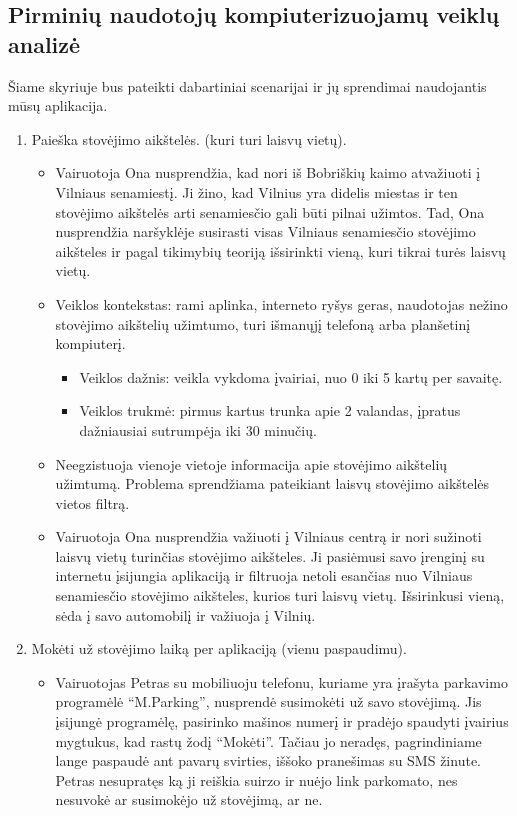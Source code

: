 \documentclass{VUMIFPSkursinis}
\begin{document}
\subsection{Pirminių naudotojų kompiuterizuojamų veiklų analizė}
Šiame skyriuje bus pateikti dabartiniai scenarijai ir jų sprendimai naudojantis mūsų aplikacija.
\begin{enumerate}[label = \textbf{PV\arabic*.}]
	\item Paieška stovėjimo aikštelės. (kuri turi laisvų vietų).
		\begin{itemize}[label={-}]
			\item Vairuotoja Ona nusprendžia, kad nori iš Bobriškių kaimo atvažiuoti į Vilniaus senamiestį. Ji žino, kad Vilnius yra didelis miestas ir ten stovėjimo aikštelės  arti senamiesčio gali būti pilnai užimtos. Tad, Ona nusprendžia naršyklėje susirasti visas Vilniaus senamiesčio stovėjimo aikšteles ir pagal tikimybių teoriją išsirinkti vieną, kuri tikrai turės laisvų vietų.

			\item Veiklos kontekstas: rami aplinka, interneto ryšys geras, naudotojas nežino stovėjimo aikštelių užimtumo, turi išmanųjį telefoną arba planšetinį kompiuterį.
				\begin{itemize}[label={$\bullet$}]
					\item Veiklos dažnis: veikla vykdoma įvairiai, nuo 0 iki 5 kartų per savaitę.
					\item Veiklos trukmė: pirmus kartus trunka apie 2 valandas, įpratus dažniausiai sutrumpėja iki 30 minučių.
				\end{itemize}
			\item Neegzistuoja vienoje vietoje informacija apie stovėjimo aikštelių užimtumą. Problema sprendžiama pateikiant laisvų stovėjimo aikštelės vietos filtrą.

			\item Vairuotoja Ona nusprendžia važiuoti į Vilniaus centrą ir nori sužinoti laisvų vietų turinčias stovėjimo aikšteles. Ji pasiėmusi savo įrenginį su internetu įsijungia aplikaciją ir filtruoja netoli esančias nuo Vilniaus senamiesčio stovėjimo aikšteles, kurios turi laisvų vietų. Išsirinkusi vieną, sėda į savo automobilį ir važiuoja į Vilnių.
		\end{itemize}	
	
		
	\item Mokėti už stovėjimo laiką per aplikaciją (vienu paspaudimu).
		\begin{itemize}[label={-}]
			\item Vairuotojas Petras su mobiliuoju telefonu, kuriame yra įrašyta parkavimo programėlė “M.Parking”, nusprendė susimokėti už savo stovėjimą. Jis įsijungė programėlę, pasirinko mašinos numerį ir pradėjo spaudyti įvairius mygtukus, kad rastų žodį “Mokėti”. Tačiau jo neradęs, pagrindiniame lange paspaudė ant pavarų svirties, iššoko pranešimas su SMS žinute. Petras nesupratęs ką ji reiškia suirzo ir nuėjo link parkomato, nes nesuvokė ar susimokėjo už stovėjimą, ar ne.


\end{itemize}
\end{enumerate}
\end{document}
